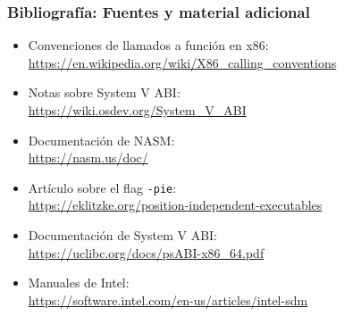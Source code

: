 \documentclass[aspectratio=169]{beamer}
\begin{document}
% 
% 
% 
% 
% 
% 
% 
% 

\begin{frame}[fragile]
    \frametitle{Bibliografía: Fuentes y material adicional}
    \begin{itemize}
    \item Convenciones de llamados a función en x86: \\
    \url{https://en.wikipedia.org/wiki/X86_calling_conventions}
    \item Notas sobre System V ABI: \\
    \url{https://wiki.osdev.org/System_V_ABI}
    \item Documentación de NASM: \\
    \url{https://nasm.us/doc/}
    \item Artículo sobre el flag \texttt{-pie}: \\
    \url{https://eklitzke.org/position-independent-executables}
    \item Documentación de System V ABI: \\
    \url{https://uclibc.org/docs/psABI-x86_64.pdf}
    \item Manuales de Intel: \\
    \url{https://software.intel.com/en-us/articles/intel-sdm}
    \end{itemize}
\end{frame}
\end{document}
